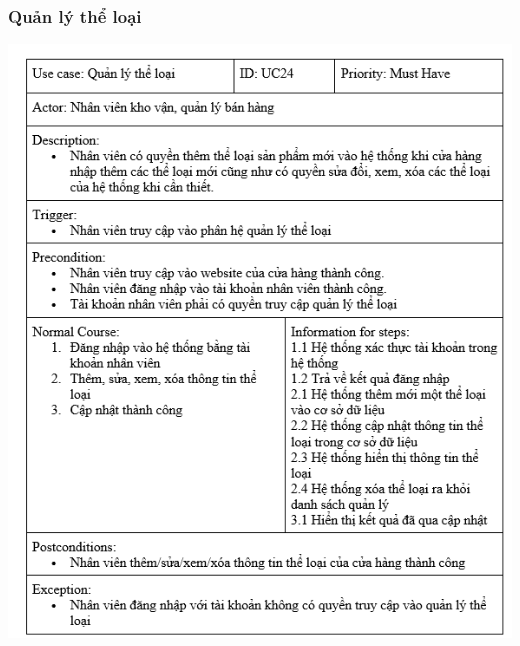 \documentclass[12pt,a4paper,2sides]{report}
\begin{document}
\subsubsection{Quản lý thể loại}
    \includegraphics[width=1\linewidth]{lib/usecase/quanlytheloai.png}\\\vspace*{1cm}    
\end{document}
